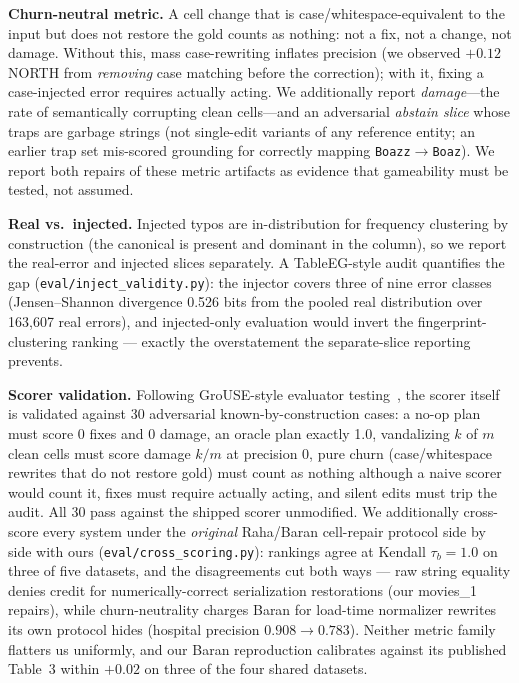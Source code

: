 \documentclass[11pt]{article}
\begin{document}
\textbf{Churn-neutral metric.} A cell change that is case/whitespace-equivalent to the
input but does not restore the gold counts as nothing: not a fix, not a change, not
damage. Without this, mass case-rewriting inflates precision (we observed $+0.12$
NORTH from \emph{removing} case matching before the correction); with it, fixing a
case-injected error requires actually acting. We additionally report
\emph{damage}---the rate of semantically corrupting clean cells---and an adversarial
\emph{abstain slice} whose traps are garbage strings (not single-edit variants of any
reference entity; an earlier trap set mis-scored grounding for correctly mapping
\texttt{Boazz}$\to$\texttt{Boaz}). We report both repairs of these metric artifacts as
evidence that gameability must be tested, not assumed.

\textbf{Real vs.\ injected.} Injected typos are in-distribution for frequency
clustering by construction (the canonical is present and dominant in the column), so we
report the real-error and injected slices separately. A TableEG-style audit
quantifies the gap (\texttt{eval/inject\_validity.py}): the injector covers three
of nine error classes (Jensen--Shannon divergence 0.526 bits from the pooled real
distribution over 163{,}607 real errors), and injected-only evaluation would
invert the fingerprint-clustering ranking --- exactly the overstatement the
separate-slice reporting prevents.

\textbf{Scorer validation.} Following GroUSE-style evaluator
testing~\cite{grouse}, the scorer itself is validated against 30 adversarial
known-by-construction cases: a no-op plan must score 0 fixes and 0 damage, an
oracle plan exactly 1.0, vandalizing $k$ of $m$ clean cells must score damage
$k/m$ at precision 0, pure churn (case/whitespace rewrites that do not restore
gold) must count as nothing although a naive scorer would count it, fixes must
require actually acting, and silent edits must trip the audit. All 30 pass
against the shipped scorer unmodified. We additionally cross-score every system
under the \emph{original} Raha/Baran cell-repair protocol side by side with ours
(\texttt{eval/cross\_scoring.py}): rankings agree at Kendall $\tau_b{=}1.0$ on
three of five datasets, and the disagreements cut both ways --- raw string
equality denies credit for numerically-correct serialization restorations (our
movies\_1 repairs), while churn-neutrality charges Baran for load-time
normalizer rewrites its own protocol hides (hospital precision
$0.908\!\to\!0.783$). Neither metric family flatters us uniformly, and our Baran
reproduction calibrates against its published Table~3 within $+0.02$ on three of
the four shared datasets.
\end{document}

